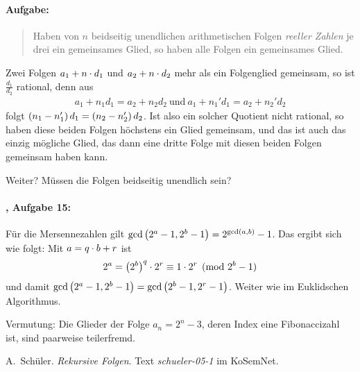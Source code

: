 \documentclass[11pt,a4paper]{article}
\begin{document}
\paragraph{Aufgabe:} 
\begin{quote}
  Haben von $n$ beidseitig unendlichen arithmetischen Folgen \emph{reeller
  Zahlen} je drei ein gemeinsames Glied, so haben alle Folgen ein gemeinsames
  Glied.
\end{quote}
\begin{loesung}
  Zwei Folgen $a_1+n\cdot d_1$ und $a_2+n\cdot d_2$ mehr als ein Folgenglied
  gemeinsam, so ist $\frac{d_1}{d_2}$ rational, denn aus 
  \begin{gather*}
    a_1+n_1d_1=a_2+n_2d_2\ \text{und}\ a_1+n_1'd_1=a_2+n_2'd_2
  \end{gather*}
  folgt $\left(n_1-n_1'\right)d_1=\left(n_2-n_2'\right)d_2$.  Ist also ein solcher Quotient
  nicht rational, so haben diese beiden Folgen höchstens ein Glied gemeinsam,
  und das ist auch das einzig mögliche Glied, das dann eine dritte Folge mit
  diesen beiden Folgen gemeinsam haben kann.

  Weiter? Müssen die Folgen beidseitig unendlich sein? 
\end{loesung}

\paragraph{\cite{S}, Aufgabe 15:}
Für die Mersennezahlen gilt $\gcd\left(2^a-1,2^b-1\right)=2^{\gcd(a,b)}-1$.  Das
ergibt sich wie folgt: Mit $a=q\cdot b+r$ ist 
\begin{gather*}
  2^a=\left(2^b\right)^q\cdot 2^r\equiv 1\cdot 2^r \pmod{2^b-1}
\end{gather*}
und damit $\gcd\left(2^a-1,2^b-1\right)=\gcd\left(2^b-1,2^r-1\right)$.  Weiter wie im
Euklidschen Algorithmus.

Vermutung: Die Glieder der  Folge $a_n=2^n-3$, deren Index eine Fibonaccizahl
ist, sind paarweise teilerfremd.

\begin{thebibliography}{Wor77}

 A.~Schüler.  \newblock \emph{Rekursive Folgen}.  Text
  \emph{schueler-05-1} im KoSemNet.
\end{thebibliography}
\end{document}
